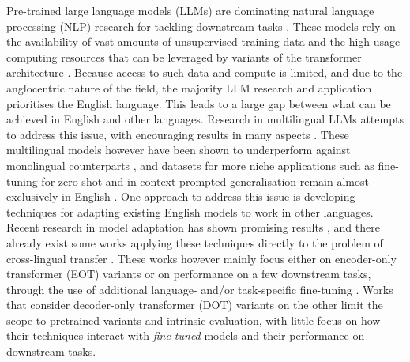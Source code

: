 \documentclass[11pt]{article}
\begin{document}
Pre-trained large language models (LLMs) are dominating natural language processing (NLP) research
for tackling downstream tasks \citep{devlin_bert_2019,raffel_exploring_2020,brown_language_2020}.
These models rely on the availability of vast amounts of unsupervised training data and the high
usage computing resources that can be leveraged by variants of the transformer architecture
\citep{vaswani_attention_2017}. Because access to such data and compute is limited, and due to the
anglocentric nature of the field, the majority LLM research and application prioritises the English
language. This leads to a large gap between what can be achieved in English and other languages.
Research in multilingual LLMs attempts to address this issue, with encouraging results in many
aspects \citep{conneau_unsupervised_2020,bigscience_workshop_bloom_2022}. These multilingual models
however have been shown to underperform against monolingual counterparts \citep{wu_are_2020}, and
datasets for more niche applications such as fine-tuning for zero-shot and in-context prompted
generalisation remain almost exclusively in English
\citep{bach_promptsource_2022,mishra_cross-task_2022}. One approach to address this issue is
developing techniques for adapting existing English models to work in other languages. Recent
research in model adaptation has shown promising results
\citep{houlsby_parameter-efficient_2019,ainsworth_git_2022}, and there already exist some works
applying these techniques directly to the problem of cross-lingual transfer
\citep{artetxe_cross-lingual_2020}. These works however mainly focus either on encoder-only
transformer (EOT) variants or on performance on a few downstream tasks, through the use of
additional language- and/or task-specific fine-tuning
\citep{de_vries_adapting_2021,gogoulou_cross-lingual_2022}. Works that consider decoder-only
transformer (DOT) variants on the other \citep{de_vries_as_2021, minixhofer_wechsel_2022} limit the
scope to pretrained variants and intrinsic evaluation, with little focus on how their techniques
interact with \textit{fine-tuned} models and their performance on downstream tasks.
\end{document}
